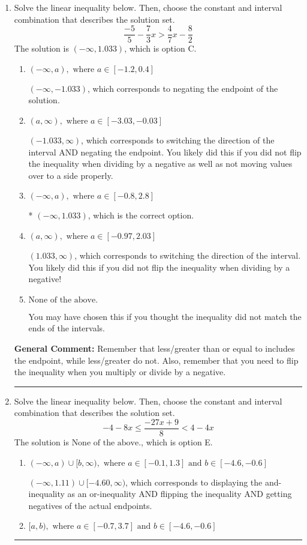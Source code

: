 \documentclass{extbook}[14pt]
\newcommand{\litem}[1]{\item #1

\rule{\textwidth}{0.4pt}}
\begin{document}
\begin{enumerate}\litem{
Solve the linear inequality below. Then, choose the constant and interval combination that describes the solution set.
\[ \frac{-5}{5} - \frac{7}{3} x > \frac{4}{7} x - \frac{8}{2} \]
The solution is \( (-\infty, 1.033) \), which is option C.\begin{enumerate}[label=\Alph*.]
\item \( (-\infty, a), \text{ where } a \in [-1.2, 0.4] \)

 $(-\infty, -1.033)$, which corresponds to negating the endpoint of the solution.
\item \( (a, \infty), \text{ where } a \in [-3.03, -0.03] \)

 $(-1.033, \infty)$, which corresponds to switching the direction of the interval AND negating the endpoint. You likely did this if you did not flip the inequality when dividing by a negative as well as not moving values over to a side properly.
\item \( (-\infty, a), \text{ where } a \in [-0.8, 2.8] \)

* $(-\infty, 1.033)$, which is the correct option.
\item \( (a, \infty), \text{ where } a \in [-0.97, 2.03] \)

 $(1.033, \infty)$, which corresponds to switching the direction of the interval. You likely did this if you did not flip the inequality when dividing by a negative!
\item \( \text{None of the above}. \)

You may have chosen this if you thought the inequality did not match the ends of the intervals.
\end{enumerate}

\textbf{General Comment:} Remember that less/greater than or equal to includes the endpoint, while less/greater do not. Also, remember that you need to flip the inequality when you multiply or divide by a negative.
}
\litem{
Solve the linear inequality below. Then, choose the constant and interval combination that describes the solution set.
\[ -4 - 8 x \leq \frac{-27 x + 9}{8} < 4 - 4 x \]
The solution is \( \text{None of the above.} \), which is option E.\begin{enumerate}[label=\Alph*.]
\item \( (-\infty, a) \cup [b, \infty), \text{ where } a \in [-0.1, 1.3] \text{ and } b \in [-4.6, -0.6] \)

$(-\infty, 1.11) \cup [-4.60, \infty)$, which corresponds to displaying the and-inequality as an or-inequality AND flipping the inequality AND getting negatives of the actual endpoints.
\item \( [a, b), \text{ where } a \in [-0.7, 3.7] \text{ and } b \in [-4.6, -0.6] \)


\end{enumerate}}
\end{enumerate}
\end{document}
